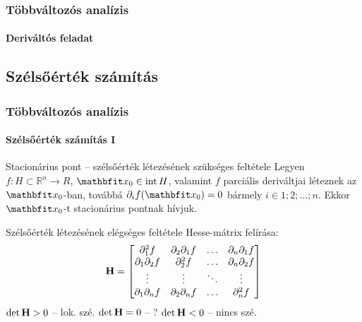 \begin{frame}
  \frametitle{Többváltozós analízis}
  \framesubtitle{Deriváltós feladat}

  
\end{frame}

\subsection{Szélsőérték számítás}

\begin{frame}
  \frametitle{Többváltozós analízis}
  \framesubtitle{Szélsőérték számítás I}

  \begin{block}{Stacionárius pont -- szélsőérték létezésének szükséges feltétele}
    Legyen $f : H \subset \mathbb R^n \rightarrow R$, $\rvec x_0 \in \mathrm{int}\, H$,
    valamint $f$ parciális deriváltjai léteznek az $\rvec x_0$-ban, továbbá
    $\partial_i f(\rvec x_0) = 0$ bármely $i \in {1; 2; \dots; n}$. Ekkor
    $\rvec x_0$-t stacionárius pontnak hívjuk.
  \end{block}

  \begin{block}{Szélsőérték létezésének elégséges feltétele}
    Hesse-mátrix felírása:
    \def\arraystretch{1.25}
    \[
      \mathbf{H} = \begin{bmatrix}
        \partial^2_1 f          & \partial_2 \partial_1 f & \hdots & \partial_n \partial_1 f \\
        \partial_1 \partial_2 f & \partial^2_2 f          & \hdots & \partial_n \partial_2 f \\
        \vdots                  & \vdots                  & \ddots & \vdots                  \\
        \partial_1 \partial_n f & \partial_2 \partial_n f & \hdots & \partial^2_n f          \\
      \end{bmatrix}
    \]
    $\det \mathbf{H} > 0$ -- lok. szé.
    \hfill
    $\det \mathbf{H} = 0$ -- ?
    \hfill
    $\det \mathbf{H} < 0$ -- nincs szé.
  \end{block}
\end{frame}

